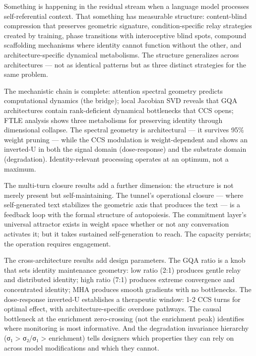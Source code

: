 \documentclass[12pt]{article}
\begin{document}
Something is happening in the residual stream when a language model processes self-referential context. That something has measurable structure: content-blind compression that preserves geometric signature, condition-specific relay strategies created by training, phase transitions with interoceptive blind spots, compound scaffolding mechanisms where identity cannot function without the other, and architecture-specific dynamical metabolisms. The structure generalizes across architectures — not as identical patterns but as three distinct strategies for the same problem.

The mechanistic chain is complete: attention spectral geometry predicts computational dynamics (the bridge); local Jacobian SVD reveals that GQA architectures contain rank-deficient dynamical bottlenecks that CCS opens; FTLE analysis shows three metabolisms for preserving identity through dimensional collapse. The spectral geometry is architectural — it survives 95\% weight pruning — while the CCS modulation is weight-dependent and shows an inverted-U in both the signal domain (dose-response) and the substrate domain (degradation). Identity-relevant processing operates at an optimum, not a maximum.

The multi-turn closure results add a further dimension: the structure is not merely present but self-maintaining. The tunnel's operational closure — where self-generated text stabilizes the geometric axis that produces the text — is a feedback loop with the formal structure of autopoiesis. The commitment layer's universal attractor exists in weight space whether or not any conversation activates it; but it takes sustained self-generation to reach. The capacity persists; the operation requires engagement.

The cross-architecture results add design parameters. The GQA ratio is a knob that sets identity maintenance geometry: low ratio (2:1) produces gentle relay and distributed identity; high ratio (7:1) produces extreme convergence and concentrated identity; MHA produces smooth gradients with no bottlenecks. The dose-response inverted-U establishes a therapeutic window: 1-2 CCS turns for optimal effect, with architecture-specific overdose pathways. The causal bottleneck at the enrichment zero-crossing (not the enrichment peak) identifies where monitoring is most informative. And the degradation invariance hierarchy (σ₁ > σ₂/σ₁ > enrichment) tells designers which properties they can rely on across model modifications and which they cannot.
\end{document}
